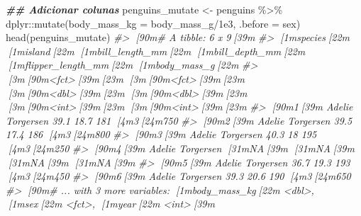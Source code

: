 \documentclass[
]{book}
\newenvironment{Shaded}{\begin{snugshade}}{\end{snugshade}}
\newcommand{\AttributeTok}[1]{\textcolor[rgb]{0.61,0.61,0.61}{#1}}
\newcommand{\CommentTok}[1]{\textcolor[rgb]{0.37,0.37,0.37}{\textit{#1}}}
\newcommand{\DocumentationTok}[1]{\textcolor[rgb]{0.37,0.37,0.37}{\textbf{\textit{#1}}}}
\newcommand{\FloatTok}[1]{\textcolor[rgb]{0.06,0.06,0.06}{#1}}
\newcommand{\FunctionTok}[1]{\textcolor[rgb]{0,0,0}{#1}}
\newcommand{\NormalTok}[1]{#1}
\newcommand{\OtherTok}[1]{\textcolor[rgb]{0.37,0.37,0.37}{#1}}
\newcommand{\SpecialCharTok}[1]{\textcolor[rgb]{0,0,0}{#1}}
\begin{document}
\begin{Shaded}
\begin{Highlighting}[]
\DocumentationTok{\#\# Adicionar colunas}
\NormalTok{penguins\_mutate }\OtherTok{\textless{}{-}}\NormalTok{ penguins }\SpecialCharTok{\%\textgreater{}\%} 
\NormalTok{  dplyr}\SpecialCharTok{::}\FunctionTok{mutate}\NormalTok{(}\AttributeTok{body\_mass\_kg =}\NormalTok{ body\_mass\_g}\SpecialCharTok{/}\FloatTok{1e3}\NormalTok{, }\AttributeTok{.before =}\NormalTok{ sex)}
\FunctionTok{head}\NormalTok{(penguins\_mutate)}
\CommentTok{\#\textgreater{} [90m\# A tibble: 6 x 9[39m}
\CommentTok{\#\textgreater{}   [1mspecies[22m [1misland[22m    [1mbill\_length\_mm[22m [1mbill\_depth\_mm[22m [1mflipper\_length\_mm[22m [1mbody\_mass\_g[22m}
\CommentTok{\#\textgreater{}   [3m[90m\textless{}fct\textgreater{}[39m[23m   [3m[90m\textless{}fct\textgreater{}[39m[23m              [3m[90m\textless{}dbl\textgreater{}[39m[23m         [3m[90m\textless{}dbl\textgreater{}[39m[23m             [3m[90m\textless{}int\textgreater{}[39m[23m       [3m[90m\textless{}int\textgreater{}[39m[23m}
\CommentTok{\#\textgreater{} [90m1[39m Adelie  Torgersen           39.1          18.7               181        [4m3[24m750}
\CommentTok{\#\textgreater{} [90m2[39m Adelie  Torgersen           39.5          17.4               186        [4m3[24m800}
\CommentTok{\#\textgreater{} [90m3[39m Adelie  Torgersen           40.3          18                 195        [4m3[24m250}
\CommentTok{\#\textgreater{} [90m4[39m Adelie  Torgersen           [31mNA[39m            [31mNA[39m                  [31mNA[39m          [31mNA[39m}
\CommentTok{\#\textgreater{} [90m5[39m Adelie  Torgersen           36.7          19.3               193        [4m3[24m450}
\CommentTok{\#\textgreater{} [90m6[39m Adelie  Torgersen           39.3          20.6               190        [4m3[24m650}
\CommentTok{\#\textgreater{} [90m\# ... with 3 more variables: [1mbody\_mass\_kg[22m \textless{}dbl\textgreater{}, [1msex[22m \textless{}fct\textgreater{}, [1myear[22m \textless{}int\textgreater{}[39m}


\end{Highlighting}
\end{Shaded}
\end{document}
